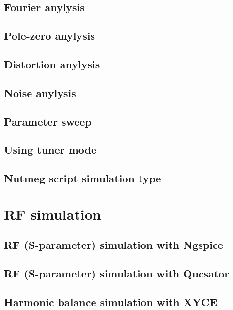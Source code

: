 \subsection{Fourier anylysis}

\subsection{Pole-zero anylysis}

\subsection{Distortion anylysis}

\subsection{Noise anylysis}

\subsection{Parameter sweep}

\subsection{Using tuner mode}

\subsection{Nutmeg script simulation type}

\section{RF simulation}

\subsection{RF (S-parameter) simulation with Ngspice}

\subsection{RF (S-parameter) simulation with Qucsator}

\subsection{Harmonic balance simulation with XYCE}

